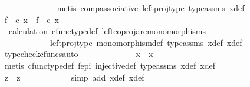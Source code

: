 \begin{isabellebody}
\ \ \ \ \ \ \ \ \ \ \ \ \isamarkupfalse%
\ {\isacharparenleft}{\kern0pt}metis\ comp{\isacharunderscore}{\kern0pt}associative{}\ left{\isacharunderscore}{\kern0pt}proj{\isacharunderscore}{\kern0pt}type\ type{\isacharunderscore}{\kern0pt}assms{\isacharparenleft}{\kern0pt}{}{\isacharparenright}{\kern0pt}\ x{}{\isacharunderscore}{\kern0pt}def{\isacharparenright}{\kern0pt}\isanewline
\ \ \ \ \ \ \ \ \ \ \isamarkupfalse%
\ \isamarkupfalse%
\ {\isachardoublequoteopen}f\ \ {\isasymcirc}\isactrlsub c\ x{}\ {\isacharequal}{\kern0pt}\ f\ \ {\isasymcirc}\isactrlsub c\ x{}{\isachardoublequoteclose}\isanewline
\ \ \ \ \ \ \ \ \ \ \ \ \isamarkupfalse%
\ \ calculation\ cfunc{\isacharunderscore}{\kern0pt}type{\isacharunderscore}{\kern0pt}def\ left{\isacharunderscore}{\kern0pt}coproj{\isacharunderscore}{\kern0pt}are{\isacharunderscore}{\kern0pt}monomorphisms\isanewline
\ \ \ \ \ \ \ \ \ \ \ \ left{\isacharunderscore}{\kern0pt}proj{\isacharunderscore}{\kern0pt}type\ monomorphism{\isacharunderscore}{\kern0pt}def\ type{\isacharunderscore}{\kern0pt}assms{\isacharparenleft}{\kern0pt}{}{\isacharparenright}{\kern0pt}\ x{}{\isacharunderscore}{\kern0pt}def\ x{}{\isacharunderscore}{\kern0pt}def\ \isamarkupfalse%
\ {\isacharparenleft}{\kern0pt}typecheck{\isacharunderscore}{\kern0pt}cfuncs{\isacharcomma}{\kern0pt}auto{\isacharparenright}{\kern0pt}\isanewline
\ \ \ \ \ \ \ \ \ \ \isamarkupfalse%
\ \isamarkupfalse%
\ {\isachardoublequoteopen}x{}\ {\isacharequal}{\kern0pt}\ x{}{\isachardoublequoteclose}\isanewline
\ \ \ \ \ \ \ \ \ \ \ \ \isamarkupfalse%
\ {\isacharparenleft}{\kern0pt}metis\ cfunc{\isacharunderscore}{\kern0pt}type{\isacharunderscore}{\kern0pt}def\ f{\isacharunderscore}{\kern0pt}epi\ injective{\isacharunderscore}{\kern0pt}def\ type{\isacharunderscore}{\kern0pt}assms{\isacharparenleft}{\kern0pt}{}{\isacharparenright}{\kern0pt}\ x{}{\isacharunderscore}{\kern0pt}def\ x{}{\isacharunderscore}{\kern0pt}def{\isacharparenright}{\kern0pt}\isanewline
\ \ \ \ \ \ \ \ \isamarkupfalse%
\isanewline
\ \ \ \ \ \ \ \ \isamarkupfalse%
\ \isamarkupfalse%
\ {\isachardoublequoteopen}z{}\ {\isacharequal}{\kern0pt}\ z{}{\isachardoublequoteclose}\isanewline
\ \ \ \ \ \ \ \ \ \ \isamarkupfalse%
\ {\isacharparenleft}{\kern0pt}simp\ add{\isacharcolon}{\kern0pt}\ x{}{\isacharunderscore}{\kern0pt}def\ x{}{\isacharunderscore}{\kern0pt}def{\isacharparenright}{\kern0pt}\isanewline

\end{isabellebody}
